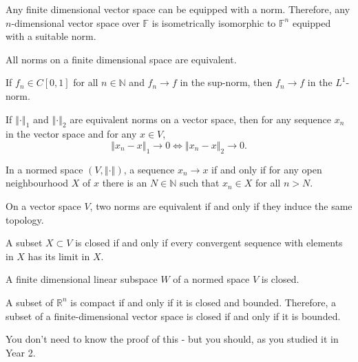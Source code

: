 \documentclass[a4paper]{article}
\newcommand{\N}{\mathbb{N}}
\newcommand{\F}{\mathbb{F}}
\newcommand{\R}{\mathbb{R}}
\newcommand{\norm}[1]{\left\Vert #1 \right\Vert}
\newcommand{\<}{\langle}
\renewcommand{\>}{\rangle}
\begin{document}
\begin{prop}
  Any finite dimensional vector space can be equipped with a norm. Therefore, any $n$-dimensional vector space over $\F$ is isometrically isomorphic to $\F^n$ equipped with a suitable norm.
\end{prop}

\begin{thm}
  All norms on a finite dimensional space are equivalent.
\end{thm}

\begin{prop}
If $f_n\in C[0,1]$ for all $n\in\N$ and $f_n\to f$ in the sup-norm, then $f_n\to f$ in the $L^1$-norm.
\end{prop}

\begin{prop}
  If $\norm{\cdot}_1$ and $\norm{\cdot}_2$  are equivalent norms on a vector space, then for any sequence $x_n$ in the vector space and for any $x\in V$,
  $$\norm{x_n-x}_1\to0 \iff \norm{x_n-x}_2\to0.$$
\end{prop}

\begin{lemma}
  In a normed space $(V,\norm{\cdot})$, a sequence $x_n\to x$ if and only if for any open neighbourhood $X$ of $x$ there is an $N\in\N$ such that $x_n\in X$ for all $n>N$.
\end{lemma}

\begin{prop}
  On a vector space $V$, two norms are equivalent if and only if they induce the same topology.
\end{prop}

\begin{lemma}
  A subset $X\subset V$ is closed if and only if every convergent sequence with elements in $X$ has its limit in $X$.
\end{lemma}

\begin{prop}
  A finite dimensional linear subspace $W$ of a normed space $V$ is closed.
\end{prop}

\begin{thm}
  A subset of $\R^n$ is compact if and only if it is closed and bounded. Therefore, a subset of a finite-dimensional vector space is closed if and only if it is bounded.
\end{thm}

You don't need to know the proof of this - but you should, as you studied it in Year 2.
\end{document}
